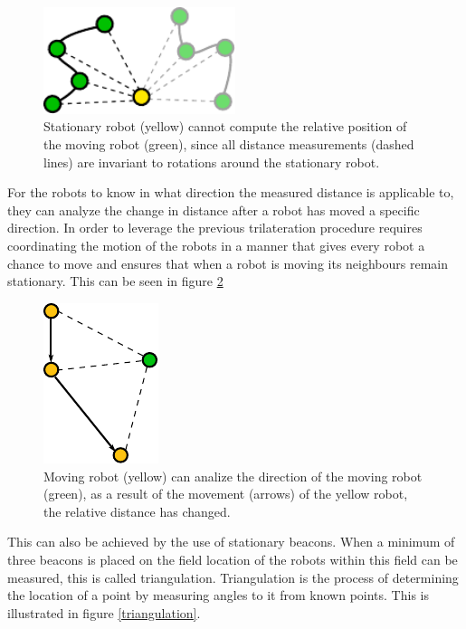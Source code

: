 \documentclass[10pt,a4paper]{article}
\begin{document}
\begin{figure}[H]
\centering
\includegraphics[width=0.5\textwidth]{drolletje.pdf}
\caption{Stationary robot (yellow) cannot compute the relative position of the moving robot (green), since all distance measurements (dashed lines) are invariant to rotations around the stationary robot.\cite{Angle}}
\label{Angle}
\end{figure}

For the robots to know in what direction the measured distance is applicable to, they can analyze the change in distance after a robot has moved a specific direction. In order to leverage the previous trilateration procedure requires coordinating the motion of the robots in a manner that gives every robot a chance to move and ensures that when a robot is moving its neighbours remain stationary. \cite{Angle}
This can be seen in figure \ref{Range} 

\begin{figure}[H]
\centering
\includegraphics[width=0.3\textwidth]{range.pdf}
\caption{Moving robot (yellow) can analize the direction of the moving robot (green), as a result of the movement (arrows) of the yellow robot, the relative distance has changed.}
\label{Range}
\end{figure}

This can also be achieved by the use of stationary beacons. When a minimum of three beacons is placed on the field location of the robots within this field can be measured, this is called triangulation. Triangulation is the process of determining the location of a point by measuring angles to it from known points. This is illustrated in figure \ref{triangulation}.
\end{document}
